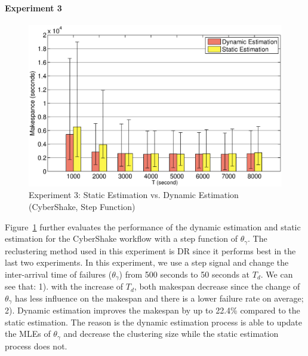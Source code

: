 \documentclass{IOS-Book-Article}
\begin{document}
\paragraph{\textbf{Experiment 3}}
\begin{figure}[!htb]
\centering
  \includegraphics[width=1\linewidth]{versus.eps}
  \caption{Experiment 3: Static Estimation vs. Dynamic Estimation (CyberShake, Step Function)}
  \label{fig:expr_static_dynamic}
\end{figure}

Figure~\ref{fig:expr_static_dynamic} further evaluates the performance of the dynamic estimation and static estimation for the CyberShake workflow with a step function of $\theta_{\gamma}$. The reclustering method used in this experiment is DR since it performs best in the last two experiments. In this experiment, we use a step signal and change the inter-arrival time of failures ($\theta_{\gamma}$) from 500 seconds to 50 seconds at $T_d$. We can see that: 1). with the increase of $T_d$, both makespan decrease since the change of  $\theta_{\gamma}$ has less influence on the makespan and there is a lower failure rate on average; 2). Dynamic estimation improves the makespan by up to 22.4\% compared to the static estimation. The reason is the dynamic estimation process is able to update the MLEs of $\theta_{\gamma}$ and decrease the clustering size while the static estimation process does not. 
\end{document}
